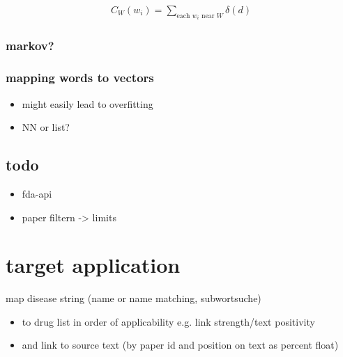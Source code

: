 \documentclass{article}
\begin{document}
\begin{align}
	C_W(w_i) = \sum_{\text{each $w_i$ near $W$}} \delta(d) \label{eq:context}
\end{align}

\subsubsection{markov?}

\subsubsection{mapping words to vectors}
\begin{itemize}
	\item might easily lead to overfitting
	\item NN or list?
\end{itemize}


\subsection{todo}
\begin{itemize}
	\item fda-api
	\item paper filtern -> limits
\end{itemize}

\section{target application}
map disease string (name or name matching, subwortsuche)
\begin{itemize}
	\item to drug list in order of applicability
		e.g. link strength/text positivity
	\item and link to source text
		(by paper id and position on text as percent float)
\end{itemize}
\end{document}
